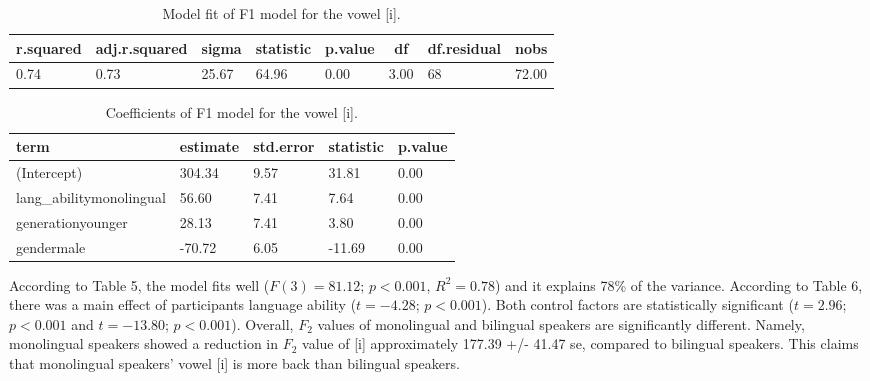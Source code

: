 \documentclass[
  man,floatsintext]{apa6}
\begin{document}
\begin{table}[H]

\begin{center}
\begin{threeparttable}

\caption{\label{tab:table3&4}Model fit of F1 model for the vowel [i].}

\begin{tabular}{llllllll}
\toprule
r.squared & \multicolumn{1}{c}{adj.r.squared} & \multicolumn{1}{c}{sigma} & \multicolumn{1}{c}{statistic} & \multicolumn{1}{c}{p.value} & \multicolumn{1}{c}{df} & \multicolumn{1}{c}{df.residual} & \multicolumn{1}{c}{nobs}\\
\midrule
0.74 & 0.73 & 25.67 & 64.96 & 0.00 & 3.00 & 68 & 72.00\\
\bottomrule
\end{tabular}

\end{threeparttable}
\end{center}

\end{table}

\begin{table}[H]

\begin{center}
\begin{threeparttable}

\caption{\label{tab:table3&4}Coefficients of F1 model for the vowel [i].}

\begin{tabular}{lllll}
\toprule
term & \multicolumn{1}{c}{estimate} & \multicolumn{1}{c}{std.error} & \multicolumn{1}{c}{statistic} & \multicolumn{1}{c}{p.value}\\
\midrule
(Intercept) & 304.34 & 9.57 & 31.81 & 0.00\\
lang\_abilitymonolingual & 56.60 & 7.41 & 7.64 & 0.00\\
generationyounger & 28.13 & 7.41 & 3.80 & 0.00\\
gendermale & -70.72 & 6.05 & -11.69 & 0.00\\
\bottomrule
\end{tabular}

\end{threeparttable}
\end{center}

\end{table}

According to Table 5, the model fits well (\(F(3)=81.12\); \(p<0.001\), \(R^2=0.78\)) and it explains 78\% of the variance. According to Table 6, there was a main effect of participants language ability (\(t=-4.28\); \(p<0.001\)). Both control factors are statistically significant (\(t=2.96\); \(p<0.001\) and \(t=-13.80\); \(p<0.001\)). Overall, \(F_2\) values of monolingual and bilingual speakers are significantly different. Namely, monolingual speakers showed a reduction in \(F_2\) value of {[}i{]} approximately 177.39 +/- 41.47 se, compared to bilingual speakers. This claims that monolingual speakers' vowel {[}i{]} is more back than bilingual speakers.
\end{document}

